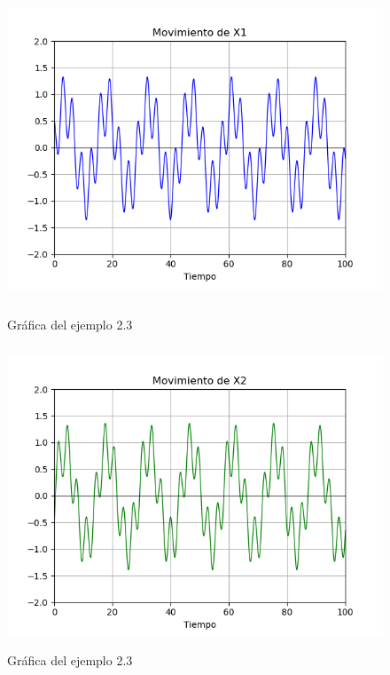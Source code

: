 \begin{figure}[h!]
	\begin{center}
        \includegraphics[height=9cm]{Ejem2_3-GrafC}
        \caption{Gráfica del ejemplo 2.3}

        \includegraphics[height=9cm]{Ejem2_3-GrafD}
        \caption{Gráfica del ejemplo 2.3}
    \end{center}
\end{figure}

